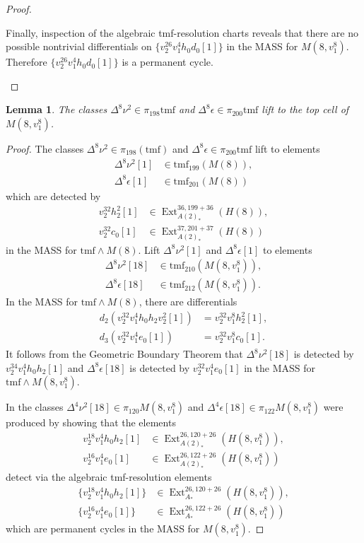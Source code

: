 \documentclass[10pt]{amsart}
\newcommand{\tmf}{\mathrm{tmf}}
\newtheorem{lem}[equation]{Lemma}
\theoremstyle{definition}
\numberwithin{equation}{section}
\numberwithin{figure}{section}
\DeclareMathOperator{\Ext}{Ext}
\begin{document}
\begin{proof}
\begin{enumerate}
Finally, inspection of the algebraic tmf-resolution charts reveals that there are no possible nontrivial differentials on $\{v_2^{26} v_1^4 h_0 d_0[1]\}$ in the MASS for $M(8,v_1^8)$. Therefore $\{v_2^{26} v_1^4 h_0 d_0[1]\}$ is a permanent cycle. 

\end{enumerate}
\end{proof}

\begin{lem}\label{lem:nu2epsilon}
The classes $\Delta^8 \nu^2 \in \pi_{198}\tmf$ and $\Delta^8 \epsilon \in \pi_{200}\tmf$ lift to the top cell of $M(8,v_1^8)$.
\end{lem}

\begin{proof}
The classes $\Delta^8 \nu^2 \in \pi_{198}(\tmf)$ and $\Delta^8 \epsilon \in \pi_{200}\tmf$ lift to elements 
\begin{align*}
\Delta^8 \nu^2[1] & \in \tmf_{199}(M(8)), \\
\Delta^8 \epsilon[1] & \in \tmf_{201}(M(8))
\end{align*}
which are detected by 
\begin{align*}
v_2^{32}h_2^2[1] & \in \Ext^{36,199+36}_{A(2)_*}(H(8)), \\
v_2^{32}c_0[1]& \in \Ext^{37,201+37}_{A(2)_*}(H(8))
\end{align*}
in the MASS for $\tmf \wedge M(8)$. Lift $\Delta^8 \nu^2[1]$ and $\Delta^8\epsilon[1]$ to elements 
\begin{align*}
\Delta^8 \nu^2[18] & \in \tmf_{210}(M(8,v_1^8)), \\
\Delta^8 \epsilon[18] & \in \tmf_{212}(M(8,v_1^8)).
\end{align*}
In the MASS for $\tmf \wedge M(8)$, there are differentials 
\begin{align*}
d_2(v_2^{32} v_1^4 h_0h_2v_2^2[1]) & = v_2^{32} v_1^8 h_2^2 [1], \\
d_3(v_2^{32} v_1^4 e_0[1]) & = v_2^{32} v_1^8 c_0 [1].
\end{align*} 
It follows from the Geometric Boundary Theorem that $\Delta^8 \nu^2[18]$ is detected by $v_2^{34} v_1^4 h_0h_2[1]$ and $\Delta^8 \epsilon[18]$ is detected by $v_2^{32}v_1^4e_0[1]$ in the MASS for $\tmf \wedge M(8,v_1^8)$. 

In \cite[Thm.~11.1]{BHHM2} the classes $\Delta^4\nu^2[18] \in \pi_{120}M(8,v_1^8)$ and $\Delta^4 \epsilon[18] \in \pi_{122}M(8,v_1^8)$ were produced by showing that the elements 
\begin{align*} 
v_2^{18}v_1^4h_0h_2[1] & \in \Ext^{26, 120+26}_{A(2)_*}(H(8,v_1^8)), \\
v_2^{16}v_1^4e_0[1] & \in \Ext^{26, 122+26}_{A(2)_*}(H(8,v_1^8))
\end{align*}
detect via the algebraic tmf-resolution elements 
\begin{align*} 
\{v_2^{18}v_1^4h_0h_2[1]\} & \in \Ext^{26,120+26}_{A_*}(H(8,v_1^8)), \\
\{v_2^{16}v_1^4e_0[1]\} & \in \Ext^{26,122+26}_{A_*}(H(8,v_1^8)) 
\end{align*} 
which are permanent cycles in the MASS for $M(8,v_1^8)$.


\end{proof}
\end{document}
